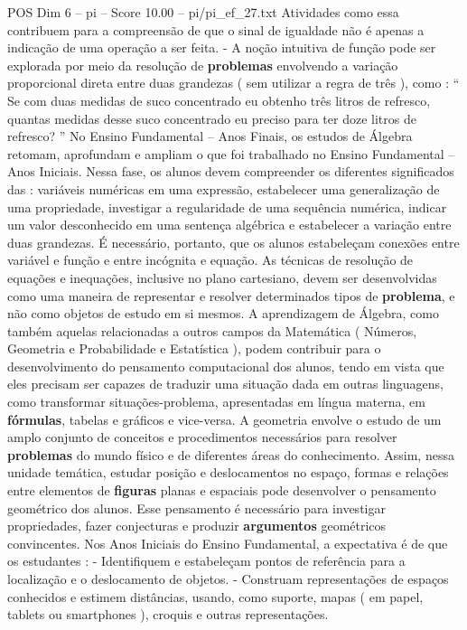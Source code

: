 \begin{textsample}{POS Dim 6 – pi – Score 10.00 – pi/pi\_ef\_27.txt}
Atividades como essa contribuem para a compreensão de que o sinal de igualdade não é apenas a indicação de uma operação a ser feita. - A noção intuitiva de função pode ser explorada por meio da resolução de \textbf{problemas} envolvendo a variação proporcional direta entre duas grandezas ( sem utilizar a regra de três ), como : “ Se com duas medidas de suco concentrado eu obtenho três litros de refresco, quantas medidas desse suco concentrado eu preciso para ter doze litros de refresco? ” No Ensino Fundamental – Anos Finais, os estudos de Álgebra retomam, aprofundam e ampliam o que foi trabalhado no Ensino Fundamental – Anos Iniciais.
Nessa fase, os alunos devem compreender os diferentes significados das : variáveis numéricas em uma expressão, estabelecer uma generalização de uma propriedade, investigar a regularidade de uma sequência numérica, indicar um valor desconhecido em uma sentença algébrica e estabelecer a variação entre duas grandezas.
É necessário, portanto, que os alunos estabeleçam conexões entre variável e função e entre incógnita e equação.
As técnicas de resolução de equações e inequações, inclusive no plano cartesiano, devem ser desenvolvidas como uma maneira de representar e resolver determinados tipos de \textbf{problema}, e não como objetos de estudo em si mesmos.
A aprendizagem de Álgebra, como também aquelas relacionadas a outros campos da Matemática ( Números, Geometria e Probabilidade e Estatística ), podem contribuir para o desenvolvimento do pensamento computacional dos alunos, tendo em vista que eles precisam ser capazes de traduzir uma situação dada em outras linguagens, como transformar situações-problema, apresentadas em língua materna, em \textbf{fórmulas}, tabelas e gráficos e vice-versa.
A geometria envolve o estudo de um amplo conjunto de conceitos e procedimentos necessários para resolver \textbf{problemas} do mundo físico e de diferentes áreas do conhecimento.
Assim, nessa unidade temática, estudar posição e deslocamentos no espaço, formas e relações entre elementos de \textbf{figuras} planas e espaciais pode desenvolver o pensamento geométrico dos alunos.
Esse pensamento é necessário para investigar propriedades, fazer conjecturas e produzir \textbf{argumentos} geométricos convincentes.
Nos Anos Iniciais do Ensino Fundamental, a expectativa é de que os estudantes : - Identifiquem e estabeleçam pontos de referência para a localização e o deslocamento de objetos. - Construam representações de espaços conhecidos e estimem distâncias, usando, como suporte, mapas ( em papel, tablets ou smartphones ), croquis e outras representações.

\end{textsample}
